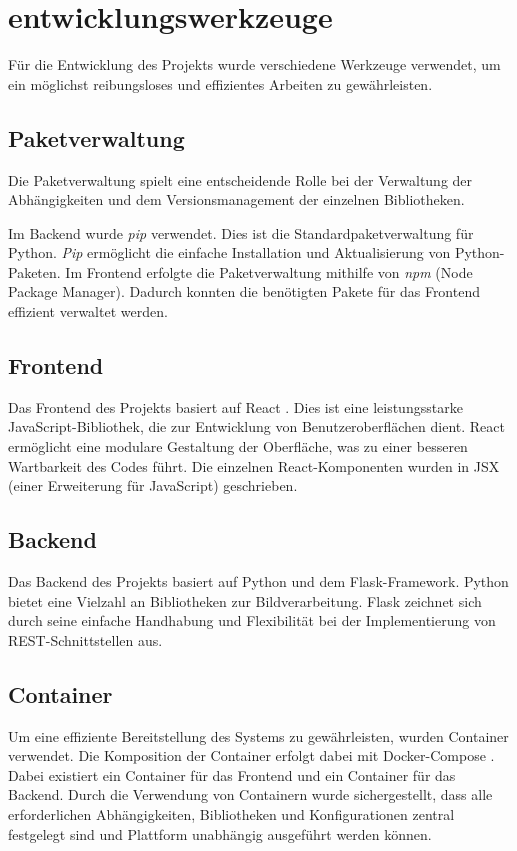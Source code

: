 \section{entwicklungswerkzeuge}
Für die Entwicklung des Projekts wurde verschiedene Werkzeuge verwendet, um ein möglichst reibungsloses und effizientes Arbeiten zu gewährleisten.

\subsection{Paketverwaltung}
Die Paketverwaltung spielt eine entscheidende Rolle bei der Verwaltung der Abhängigkeiten und dem Versionsmanagement der einzelnen Bibliotheken.

Im Backend wurde \textit{pip} verwendet. Dies ist die Standardpaketverwaltung für Python. \textit{Pip} ermöglicht die einfache Installation und Aktualisierung von Python-Paketen. Im Frontend erfolgte die Paketverwaltung mithilfe von  \textit{npm} (Node Package Manager). Dadurch konnten die benötigten Pakete für das Frontend effizient verwaltet werden.

\subsection{Frontend}
Das Frontend des Projekts basiert auf React \cite{react}. Dies ist eine leistungsstarke JavaScript-Bibliothek, die zur Entwicklung von Benutzeroberflächen dient. React ermöglicht eine modulare Gestaltung der Oberfläche, was zu einer besseren Wartbarkeit des Codes führt. Die einzelnen React-Komponenten wurden in JSX (einer Erweiterung für JavaScript) geschrieben. 

\subsection{Backend}
Das Backend des Projekts basiert auf Python und dem Flask-Framework. Python bietet eine Vielzahl an Bibliotheken zur Bildverarbeitung. Flask zeichnet sich durch seine einfache Handhabung und Flexibilität bei der Implementierung von REST-Schnittstellen aus.

\subsection{Container}
Um eine effiziente Bereitstellung des Systems zu gewährleisten, wurden Container verwendet. Die Komposition der Container erfolgt dabei mit Docker-Compose \cite{docker_compose}. Dabei existiert ein Container für das Frontend und ein Container für das Backend. Durch die Verwendung von Containern wurde sichergestellt, dass alle erforderlichen Abhängigkeiten, Bibliotheken und Konfigurationen zentral festgelegt sind und Plattform unabhängig ausgeführt werden können.